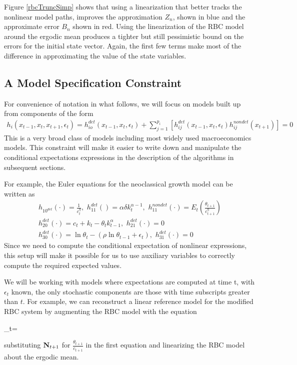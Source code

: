 \documentclass[12pt]{article}
\begin{document}
Figure \ref{rbcTruncSimp} shows that using a 
linearization that better tracks the 
nonlinear model paths, improves the approximation $Z_n$, shown in blue  and the approximate error  $B_n$ shown in red.
Using the linearization of the RBC model around the ergodic mean produces a tighter but still pessimistic bound on the errors for the initial state vector.
Again, the first few terms make most of the difference in approximating the value of the state variables.


\subsection{A Model Specification Constraint}
\label{sec:convenient}



For convenience of notation in what follows, 
we will focus on models built up from components of the form
\begin{gather}
  h_i(x_{t-1},x_{t},x_{t+1},\epsilon_t)=h^{det}_{io}(x_{t-1},x_{t},\epsilon_t)+\sum_{j=1}^{p_i} [h^{det}_{ij}(x_{t-1},x_{t},\epsilon_t)h^{nondet}_{ij}(x_{t+1})]=0
\end{gather}
This is a very broad class of models including most widely used
macroeconomics models.  This constraint will make it easier to write
down and manipulate the conditional expectations expressions in the
description of the algorithms in subsequent sections.

For example, the Euler equations for the  neoclassical growth  model 
\label{sec:simple-rbc-model-ext} can be written as
\begin{gather}
h_{10^{det}}(\cdot)=\frac{1}{c_t^\eta},\,\,
h_{11}^{det}()=\alpha \delta k_{t}^{\alpha-1} ,\,\,
h_{11}^{nondet}(\cdot)=E_t \left (\frac{\theta_{t+1}}{c_{t+1}^\eta} \right )\\
h_{20}^{det}(\cdot)=c_t + k_t-\theta_tk_{t-1}^\alpha,\,\,
h_{21}^{det}(\cdot)=0\\
h_{30}^{det}(\cdot)=\ln \theta_t -(\rho \ln \theta_{t-1} + \epsilon_t),\,\,
h_{31}^{det}(\cdot)=0
\end{gather}
Since we   need to compute 
the conditional expectation of nonlinear expressions,  
this setup will make it possible for us to use auxiliary
variables to correctly compute the required expected values.

We will be working with models where expectations are computed at time t, with  $\epsilon_t$  known,  the only stochastic components are those with time subscripts greater than $t$. 
For example, we can reconstruct a linear reference model for the modified RBC system
by  augmenting the RBC model with the equation 
\begin{tcolorbox}
  \rcpC_t=
\end{tcolorbox}
\noindent
substituting ${\mathbf{N}}_{t+1}$ for $\frac{\theta_{t+1}}{c_{t+1}}$ 
in the first equation and 
 linearizing the RBC model about the ergodic mean.
\end{document}
